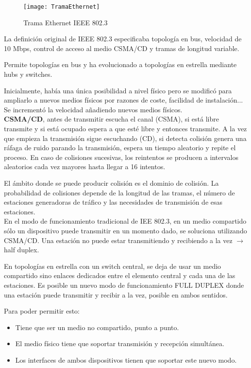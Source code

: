 \documentclass[10pt,portrait, twocolumn]{article}
\begin{document}
\begin{figure}[!ht]	
	\centering
    	\texttt{[image: TramaEthernet]}
	\caption{Trama Ethernet IEEE 802.3}
	\label{fig:TramaEthernet}
\end{figure}  

La definición original de IEEE 802.3 especificaba topología en bus, velocidad de 10 Mbps, control de acceso al medio CSMA/CD y tramas de longitud variable.

\quad Permite topologías en bus y ha evolucionado a topologías en estrella mediante hubs y switches. 

\quad Inicialmente, había una única posibilidad a nivel físico pero se modificó para ampliarlo a nuevos medios físicos por razones de coste, facilidad de instalación... Se incrementó la velocidad añadiendo nuevos medios físicos.\\

\textbf{CSMA/CD}, antes de transmitir escucha el canal (CSMA), si está libre transmite y si está ocupado espera a que esté libre y entonces transmite. A la vez que empieza la transmisión sigue escuchando (CD), si detecta colisión genera una ráfaga de ruido parando la transmisión, espera un tiempo aleatorio y repite el proceso. En caso de colisiones sucesivas, los reintentos se producen a intervalos aleatorios cada vez mayores hasta llegar a 16 intentos.

\quad El ámbito donde se puede producir colisión es el dominio de colisión. La probabilidad de colisiones depende de la longitud de las tramas, el número de estaciones generadoras de tráfico y las necesidades de transmisión de esas estaciones.\\

En el modo de funcionamiento tradicional de IEE 802.3, en un medio compartido sólo un dispositivo puede transmitir en un momento dado, se soluciona utilizando CSMA/CD. Una estación no puede estar transmitiendo y recibiendo a la vez $\rightarrow$ half duplex.

\quad En topologías en estrella con un switch central, se deja de usar un medio compartido sino enlaces dedicados entre el elemento central y cada una de las estaciones. Es posible un nuevo modo de funcionamiento FULL DUPLEX donde una estación puede transmitir y recibir a la vez, posible en ambos sentidos.

\quad Para poder permitir esto:

	\begin{itemize}
	\item Tiene que ser un medio no compartido, punto a punto.
	\item El medio físico tiene que soportar transmisión y recepción simultánea.
	\item Los interfaces de ambos dispositivos tienen que soportar este nuevo modo.
	\end{itemize}
	
\end{document}
